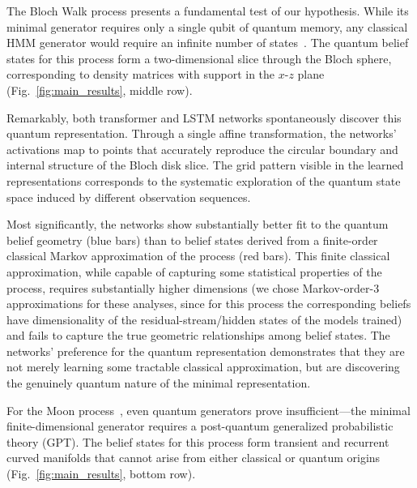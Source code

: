 \documentclass[prx,nofootinbib,onecolumn,showkeys,groupaddress,preprintnumbers,floatfix,
superscriptaddress]{revtex4-1}
\begin{document}

The Bloch Walk process presents a fundamental test of our hypothesis. While its minimal generator requires only a single qubit of quantum memory, any classical HMM generator would require an infinite number of states~\cite{Monras16_Quantum}. The quantum belief states for this process form a two-dimensional slice through the Bloch sphere, corresponding to density matrices with support in the $x$-$z$ plane (Fig.~\ref{fig:main_results}, middle row).

Remarkably, both transformer and LSTM networks spontaneously discover this quantum representation. Through a single affine transformation, the networks' activations map to points that accurately reproduce the circular boundary and internal structure of the Bloch disk slice. The grid pattern visible in the learned representations corresponds to the systematic exploration of the quantum state space induced by different observation sequences.

Most significantly, the networks show substantially better fit to the quantum belief geometry (blue bars) than to belief states derived from a finite-order classical Markov approximation of the process (red bars). This finite classical approximation, while capable of capturing some statistical properties of the process, requires substantially higher dimensions (we chose Markov-order-3 approximations for these analyses, since for this process the corresponding beliefs have dimensionality of the residual-stream/hidden states of the models trained) and fails to capture the true geometric relationships among belief states. The networks' preference for the quantum representation demonstrates that they are not merely learning some tractable classical approximation, but are discovering the genuinely quantum nature of the minimal representation.


For the Moon process~\cite{Fanizza24_Quantum}, even quantum generators prove insufficient---the minimal finite-dimensional generator requires a post-quantum generalized probabilistic theory (GPT). 
The belief states for this process form transient and recurrent curved manifolds that cannot arise from either classical or quantum origins (Fig.~\ref{fig:main_results}, bottom row).
\end{document}
